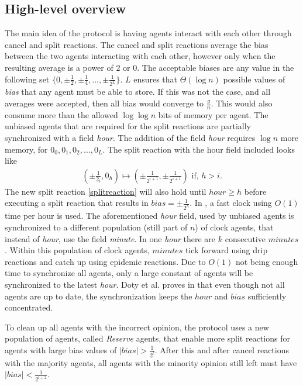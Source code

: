 \subsection{High-level overview}

The main idea of the protocol is having agents interact with each other through cancel and split reactions. The cancel and split reactions average the bias between the two agents interacting with each other, however only when the resulting average is a power of 2 or 0. The acceptable biases are any value in the following set $\{ 0, \pm \frac{1}{2}, \pm \frac{1}{4}, ...,  \pm \frac{1}{2^L} \}$. $L$ ensures that $\Theta(\log n)$ possible values of \emph{bias} that any agent must be able to store. If this was not the case, and all averages were accepted, then all bias would converge to $\frac{g}{n}$. This would also consume more than the allowed $\log \log n$ bits of memory per agent. The unbiased agents that are required for the split reactions are partially synchronized with a field \emph{hour}. The addition of the field \emph{hour} requires $\log n$ more memory, for $0_0, 0_1, 0_2, ..., 0_L$. The split reaction with the hour field included looks like
\begin{align}
    (\pm \frac{1}{2_i}, 0_h) \mapsto (\pm \frac{1}{2^{i + 1}}, \pm \frac{1}{2^{i + 1}}) \text{      if, } h > i.  \label{splitreaction}
\end{align}
The new split reaction \ref{splitreaction} will also hold until $hour \geq h$ before executing a split reaction that results in $bias = \pm \frac{1}{2^h}$. In \cite{dotyTimeSpaceOptimal2022}, a fast clock using $O(1)$ time per hour is used. The aforementioned \emph{hour} field, used by unbiased agents is synchronized to a different population (still part of $n$) of clock agents, that instead of \emph{hour}, use the field \emph{minute}. In one \emph{hour} there are $k$ consecutive $minutes$. Within this population of clock agents, $minutes$ tick forward using drip reactions and catch up using epidemic reactions. Due to $O(1)$ not being enough time to synchronize all agents, only a large constant of agents will be synchronized to the latest \emph{hour}. Doty et al. proves in \cite{dotyTimeSpaceOptimal2022} that even though not all agents are up to date, the synchronization keeps the $hour$ and $bias$ sufficiently concentrated.

To clean up all agents with the incorrect opinion, the protocol uses a new population of agents, called \emph{Reserve} agents, that enable more split reactions for agents with large bias values of $|bias| > \frac{1}{2^l}$. After this and after cancel reactions with the majority agents, all agents with the minority opinion still left must have $|bias| < \frac{1}{2^{l + 2}}$. 

